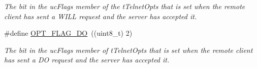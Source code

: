 \begin{DoxyCompactItemize}
\begin{DoxyCompactList}\small\item\em The bit in the uc\-Flags member of the t\-Telnet\-Opts that is set when the remote client has sent a W\-I\-L\-L request and the server has accepted it. \end{DoxyCompactList}\item 
\hypertarget{group__telnet__server_gaab89806cad0a31ec6d4cae073ffbebcb}{\#define \hyperlink{group__telnet__server_gaab89806cad0a31ec6d4cae073ffbebcb}{O\-P\-T\-\_\-\-F\-L\-A\-G\-\_\-\-D\-O}~((uint8\-\_\-t) 2)}\label{group__telnet__server_gaab89806cad0a31ec6d4cae073ffbebcb}

\begin{DoxyCompactList}\small\item\em The bit in the uc\-Flags member of t\-Telnet\-Opts that is set when the remote client has sent a D\-O request and the server has accepted it. \end{DoxyCompactList}\end{DoxyCompactItemize}

